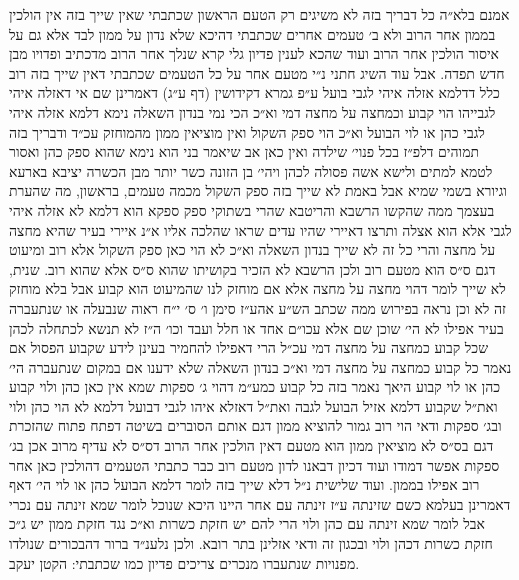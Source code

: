 \documentclass[12pt, openany]{book}
\begin{document}
\begin{multicols}{2}
אמנם בלא״ה כל דבריך בזה לא משיגים רק הטעם הראשון שכתבתי שאין שייך בזה אין הולכין בממון אחר הרוב ולא ב׳ טעמים אחרים שכתבתי דהיכא שלא נדון על ממון לבד אלא גם על איסור הולכין אחר הרוב ועוד שהכא לענין פדיון גלי קרא שנלך אחר הרוב מדכתיב ופדויו מבן חדש תפדה. אבל עוד השיג חתני נ״י מטעם אחר על כל הטעמים שכתבתי דאין שייך בזה רוב כלל דדלמא אזלה איהי לגבי בועל ע״פ גמרא דקידושין (דף ע״ג) דאמרינן שם אי דאזלה איהי לגבייהו הוי קבוע וכמחצה על מחצה דמי וא״כ הכי נמי בנדון השאלה נימא דלמא אזלה איהי לגבי כהן או לוי הבועל וא״כ הוי ספק השקול ואין מוציאין ממון מהמוחזק עכ״ד ודבריך בזה תמוהים דלפ״ז בכל פנוי׳ שילדה ואין כאן אב שיאמר בני הוא נימא שהוא ספק כהן ואסור לטמא למתים ולישא אשה פסולה לכהן ויהי׳ בן הזונה כשר יותר מבן הכשרה יציבא בארעא וגיורא בשמי שמיא אבל באמת לא שייך בזה ספק השקול מכמה טעמים, בראשון, מה שהערת בעצמך ממה שהקשו הרשבא והריטבא שהרי בשתוקי ספק ספקא הוא דלמא לא אזלה איהי לגבי אלא הוא אצלה ותרצו דאיירי שהיו עדים שראו שהלכה אליו א״נ איירי בעיר שהיא מחצה על מחצה והרי כל זה לא שייך בנדון השאלה וא״כ לא הוי כאן ספק השקול אלא רוב ומיעוט דגם ס״ס הוא מטעם רוב ולכן הרשבא לא הזכיר בקושיתו שהוא ס״ס אלא שהוא רוב. שנית, לא שייך לומר דהוי מחצה על מחצה אלא אם מוחזק לנו שהמיעוט הוא קבוע אבל בלא מוחזק זה לא וכן נראה בפירוש ממה שכתב הש״ע אהע״ז סימן ו׳ ס׳ י״ח ראוה שנבעלה או שנתעברה בעיר אפילו לא הי׳ שוכן שם אלא עכו״ם אחד או חלל ועבד וכו׳ ה״ז לא תנשא לכתחלה לכהן שכל קבוע כמחצה על מחצה דמי עכ״ל הרי דאפילו להחמיר בעינן לידע שקבוע הפסול אם נאמר כל קבוע כמחצה על מחצה דמי וא״כ בנדון השאלה שלא ידענו אם במקום שנתעברה הי׳ כהן או לוי קבוע היאך נאמר בזה כל קבוע כמע״מ דהוי ג׳ ספקות שמא אין כאן כהן ולוי קבוע ואת״ל שקבוע דלמא אזיל הבועל לגבה ואת״ל דאזלא איהו לגבי דבועל דלמא לא הוי כהן ולוי ובג׳ ספקות ודאי הוי רוב גמור להוציא ממון דגם אותם הסוברים בשיטה דפתח פתוח שהזכרת דגם בס״ס לא מוציאין ממון הוא מטעם דאין הולכין אחר הרוב דס״ס לא עדיף מרוב אכן בג׳ ספקות אפשר דמודו ועוד דכיון דבאנו לדון מטעם רוב כבר כתבתי הטעמים דהולכין כאן אחר רוב אפילו בממון. ועוד שלישית נ״ל דלא שייך בזה לומר דלמא הבועל כהן או לוי הי׳ דאף דאמרינן בעלמא כשם שזינתה ע״ז זינתה עם אחר היינו היכא שנוכל לומר שמא זינתה עם נכרי אבל לומר שמא זינתה עם כהן ולוי הרי להם יש חזקת כשרות וא״כ נגד חזקת ממון יש ג״כ חזקת כשרות דכהן ולוי ובכגון זה ודאי אזלינן בתר רובא. ולכן נלענ״ד ברור דהבכורים שנולדו מפנויות שנתעברו מנכרים צריכים פדיון כמו שכתבתי: הקטן יעקב.\\\vspace{0pt}

\end{multicols}\newpage
\end{document}
